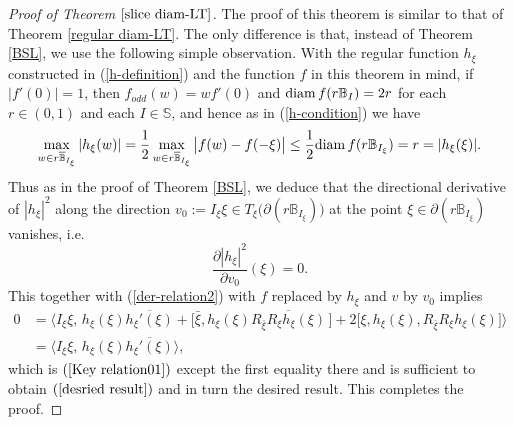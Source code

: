 \documentclass{amsart}
\theoremstyle{definition}
\theoremstyle{remark}
\numberwithin{equation}{section}
\begin{document}
\begin{proof}[Proof of Theorem $\ref{slice diam-LT}$]
The proof of this theorem is similar to that of Theorem \ref{regular diam-LT}. The only difference  is that, instead of Theorem \ref{BSL}, we use the following simple observation.
With the regular function $h_{\xi}$ constructed in (\ref{h-definition})  and the function $f$ in this theorem in mind, if $|f'(0)|=1$, then $f_{odd}(w)=wf'(0)$ and ${\rm{diam}}\,f(r\mathbb B_I)=2r$
for each $r\in(0, 1)$ and each $I\in\mathbb S$, and hence as in (\ref{h-condition}) we have \begin{equation}\label{h-weak-condition}
  \max_{w\in r\overline{\mathbb B}_{I_{\xi}}}|h_{\xi}(w)|
  =\frac12 \max_{w\in r\overline{\mathbb B}_{I_{\xi}}}\big |f(w)-f(-\xi)\big|\leq\frac12 {\rm{diam}}\, f(r\mathbb B_{I_{\xi}})=r=|h_{\xi}(\xi)|.
\end{equation}
Thus as in the proof of Theorem \ref{BSL}, we deduce that the directional derivative of $|h_{\xi}|^2$ along the direction $v_0:=I_{\xi}\xi\in T_{\xi}\big(\partial (r\mathbb B_{I_{\xi}})\big)$ at the point $\xi \in \partial (r\mathbb B_{I_{\xi}})$ vanishes, i.e.
$$\frac{\partial |h_{\xi}|^2}{\partial v_0}(\xi)=0.$$
This together with (\ref{der-relation2}) with $f$ replaced by $h_{\xi}$ and $v$ by $v_0$ implies
\begin{equation}\label{Key relation02}
\begin{split}
0&=\Big\langle I_{\xi}\xi,\,  h_{\xi}(\xi)\overline{h_{\xi}'(\xi)}+\big[\bar{\xi}, h_{\xi}(\xi)\overline{R_{\bar{\xi}}R_{\xi}h_{\xi}(\xi)}\,\big]+2\big[\xi, h_{\xi}(\xi), R_{\bar{\xi}}R_{\xi}h_{\xi}(\xi)\big] \Big\rangle
\\
&=\Big\langle I_{\xi}\xi,\,  h_{\xi}(\xi)\overline{h_{\xi}'(\xi)}\Big\rangle,
\end{split}
\end{equation}
which is $(\ref{Key relation01})$ except the first equality there and is sufficient  to obtain $(\ref{desried result})$ and in turn the desired result. This completes the proof.
\end{proof}
\end{document}

